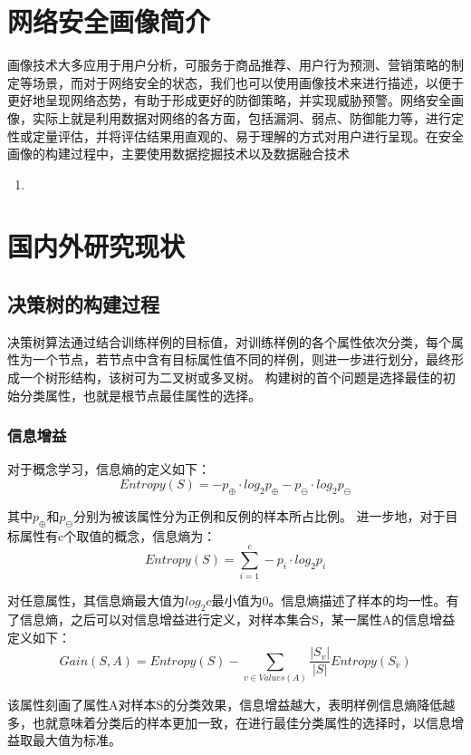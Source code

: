 \documentclass[a4papper]{article}
\begin{document}
\section{网络安全画像简介}
\par\setlength{\parindent}{2em} %
画像技术大多应用于用户分析，可服务于商品推荐、用户行为预测、营销策略的制定等场景，而对于网络安全的状态，我们也可以使用画像技术来进行描述，以便于更好地呈现网络态势，有助于形成更好的防御策略，并实现威胁预警。网络安全画像，实际上就是利用数据对网络的各方面，包括漏洞、弱点、防御能力等，进行定性或定量评估，并将评估结果用直观的、易于理解的方式对用户进行呈现。在安全画像的构建过程中，主要使用数据挖掘技术以及数据融合技术
\begin{enumerate}
\item  
\end{enumerate}
\section{国内外研究现状}
\par\setlength{\parindent}{2em} %

\subsection{决策树的构建过程}
\par\setlength{\parindent}{2em} %
决策树算法通过结合训练样例的目标值，对训练样例的各个属性依次分类，每个属性为一个节点，若节点中含有目标属性值不同的样例，则进一步进行划分，最终形成一个树形结构，该树可为二叉树或多叉树。
构建树的首个问题是选择最佳的初始分类属性，也就是根节点最佳属性的选择。
\subsubsection{信息增益}
\par\setlength{\parindent}{2em} %
对于概念学习，信息熵的定义如下：
\begin{equation*}
Entropy(S) = -p_{\oplus} \cdot log_2 p_{\oplus} - p_{\ominus} \cdot log_2 p_{\ominus}
\end{equation*}
\par\setlength{\parindent}{2em} %
其中$p_{\oplus}$和$p_{\ominus}$分别为被该属性分为正例和反例的样本所占比例。
进一步地，对于目标属性有c个取值的概念，信息熵为：
\begin{equation*}
Entropy(S) = \sum_{i = 1}^{c} -p_{i} \cdot log_2 p_{i}
\end{equation*}
\par\setlength{\parindent}{2em} %
对任意属性，其信息熵最大值为$log_2 c$最小值为0。信息熵描述了样本的均一性。有了信息熵，之后可以对信息增益进行定义，对样本集合S，某一属性A的信息增益定义如下：
\begin{equation*}
Gain(S, A) = Entropy(S) - \sum_{v \in Values(A)}\frac{\left|S_v\right|}{\left|S\right|}Entropy(S_v)
\end{equation*}
\par\setlength{\parindent}{2em} %
该属性刻画了属性A对样本S的分类效果，信息增益越大，表明样例信息熵降低越多，也就意味着分类后的样本更加一致，在进行最佳分类属性的选择时，以信息增益取最大值为标准。
\end{document}
